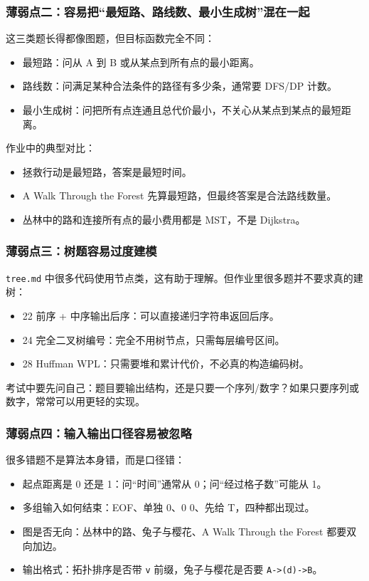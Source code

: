 \documentclass[10pt,a4paper,fontset=none]{ctexart}
\begin{document}
\subsubsection{薄弱点二：容易把“最短路、路线数、最小生成树”混在一起}
这三类题长得都像图题，但目标函数完全不同：
\begin{itemize}
  \item 最短路：问从 A 到 B 或从某点到所有点的最小距离。
  \item 路线数：问满足某种合法条件的路径有多少条，通常要 DFS/DP 计数。
  \item 最小生成树：问把所有点连通且总代价最小，不关心从某点到某点的最短距离。
\end{itemize}
作业中的典型对比：
\begin{itemize}
  \item 拯救行动是最短路，答案是最短时间。
  \item A Walk Through the Forest 先算最短路，但最终答案是合法路线数量。
  \item 丛林中的路和连接所有点的最小费用都是 MST，不是 Dijkstra。
\end{itemize}

\subsubsection{薄弱点三：树题容易过度建模}
\texttt{tree.md} 中很多代码使用节点类，这有助于理解。但作业里很多题并不要求真的建树：
\begin{itemize}
  \item 22 前序 + 中序输出后序：可以直接递归字符串返回后序。
  \item 24 完全二叉树编号：完全不用树节点，只需每层编号区间。
  \item 28 Huffman WPL：只需要堆和累计代价，不必真的构造编码树。
\end{itemize}
考试中要先问自己：题目要输出结构，还是只要一个序列/数字？如果只要序列或数字，常常可以用更轻的实现。

\subsubsection{薄弱点四：输入输出口径容易被忽略}
很多错题不是算法本身错，而是口径错：
\begin{itemize}
  \item 起点距离是 0 还是 1：问“时间”通常从 0；问“经过格子数”可能从 1。
  \item 多组输入如何结束：EOF、单独 0、0 0、先给 T，四种都出现过。
  \item 图是否无向：丛林中的路、兔子与樱花、A Walk Through the Forest 都要双向加边。
  \item 输出格式：拓扑排序是否带 \texttt{v} 前缀，兔子与樱花是否要 \texttt{A->(d)->B}。
\end{itemize}
\end{document}
